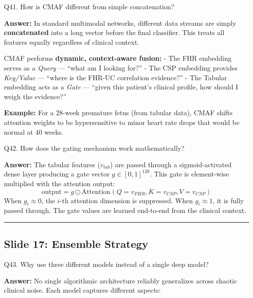 \documentclass[11pt,a4paper]{article}
\begin{document}
\begin{questionbox}
Q41. How is CMAF different from simple concatenation?
\end{questionbox}
\textbf{Answer:} In standard multimodal networks, different data streams are
simply \textbf{concatenated} into a long vector before the final
classifier. This treats all features equally regardless of clinical
context.

CMAF performs \textbf{dynamic, context-aware fusion:} - The FHR
embedding serves as a \emph{Query} --- ``what am I looking for?'' - The
CSP embedding provides \emph{Key/Value} --- ``where is the FHR-UC
correlation evidence?'' - The Tabular embedding acts as a \emph{Gate}
--- ``given this patient's clinical profile, how should I weigh the
evidence?''

\textbf{Example:} For a 28-week premature fetus (from tabular data),
CMAF shifts attention weights to be hypersensitive to minor heart rate
drops that would be normal at 40 weeks.

\begin{questionbox}
Q42. How does the gating mechanism work mathematically?
\end{questionbox}
\textbf{Answer:} The tabular features (\(v_{tab}\)) are passed through a
sigmoid-activated dense layer producing a gate vector
\(g \in [0,1]^{128}\). This gate is element-wise multiplied with the
attention output:
\[\text{output} = g \odot \text{Attention}(Q=v_{FHR}, K=v_{CSP}, V=v_{CSP})\]
When \(g_i \approx 0\), the \(i\)-th attention dimension is suppressed.
When \(g_i \approx 1\), it is fully passed through. The gate values are
learned end-to-end from the clinical context.

\begin{center}\rule{0.5\linewidth}{0.5pt}\end{center}

\subsection{Slide 17: Ensemble
Strategy}\label{slide-17-ensemble-strategy}

\begin{questionbox}
Q43. Why use three different models instead of a single deep
model?
\end{questionbox}
\textbf{Answer:} No single algorithmic architecture reliably generalizes
across chaotic clinical noise. Each model captures different aspects:
\end{document}
